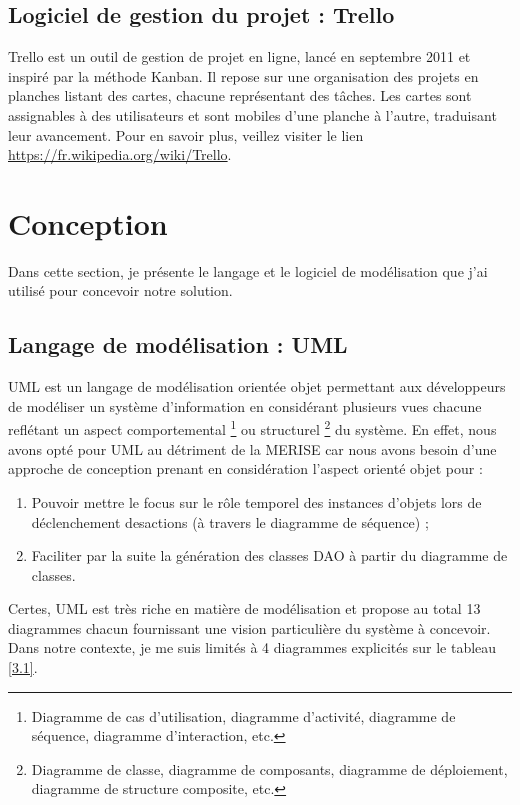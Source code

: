 \subsection{Logiciel de gestion du projet : Trello}
Trello est un outil de gestion de projet en ligne, lancé en septembre 2011 et inspiré par la méthode Kanban. Il repose sur une organisation des projets en planches listant des cartes, chacune représentant des tâches. Les cartes sont assignables à des utilisateurs et sont mobiles d'une planche à l'autre, traduisant leur avancement. Pour en savoir plus, veillez visiter le lien \href{https://fr.wikipedia.org/wiki/Trello}{https://fr.wikipedia.org/wiki/Trello}.

\section{Conception}
Dans cette section, je présente le langage et le logiciel de modélisation que j'ai utilisé pour concevoir notre solution.

\subsection{Langage de modélisation : UML}
\gls{UML} est un langage de modélisation orientée objet permettant aux développeurs de modéliser un système d’information en considérant plusieurs vues chacune reflétant un aspect comportemental \footnote{Diagramme de cas d’utilisation, diagramme d’activité, diagramme de séquence, diagramme d’interaction, etc.} ou structurel \footnote{Diagramme de classe, diagramme de composants, diagramme de déploiement, diagramme de structure composite, etc.} du système.
\newline
En effet, nous avons opté pour UML au détriment de la \gls{MERISE} car nous avons besoin
d’une approche de conception prenant en considération l’aspect orienté objet pour :
\begin{enumerate}
	\item Pouvoir mettre le focus sur le rôle temporel des instances d’objets lors de déclenchement desactions (à travers le diagramme de séquence) ;
	\item Faciliter par la suite la génération des classes \gls{DAO} à partir du diagramme de classes.
\end{enumerate}
Certes, UML est très riche en matière de modélisation et propose au total 13 diagrammes chacun fournissant une vision particulière du système à concevoir. Dans notre contexte, je me suis limités à 4 diagrammes explicités sur le tableau \ref{3.1}.

